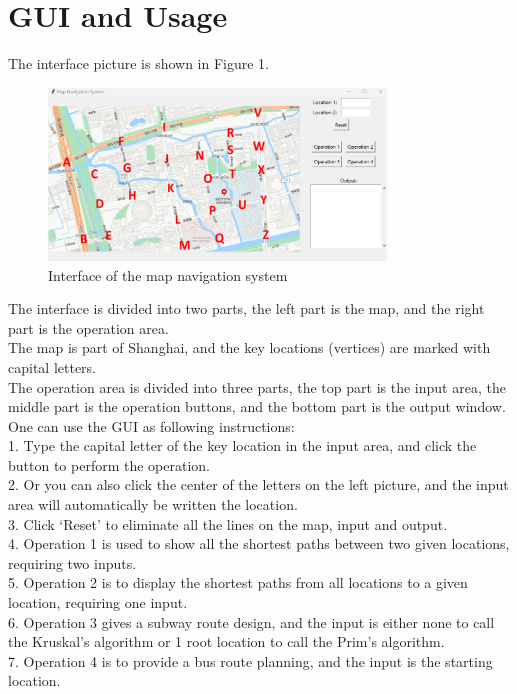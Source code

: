 \documentclass[UTF8]{ctexart}
\begin{document}
\section{GUI and Usage}
The interface picture is shown in Figure 1.\\
\begin{figure}[H]
    \centering
    \includegraphics[width=0.8\textwidth]{gui.png}
    \caption{Interface of the map navigation system}
\end{figure}
The interface is divided into two parts, the left part is the map, and the right part is the operation area.\\
The map is part of Shanghai, and the key locations (vertices) are marked with capital letters.\\
The operation area is divided into three parts, the top part is the input area, the middle part is the operation buttons,
and the bottom part is the output window.\\
One can use the GUI as following instructions:\\
1. Type the capital letter of the key location in the input area, and click the button to perform the operation.\\
2. Or you can also click the center of the letters on the left picture, and the input area will automatically be written the location.\\
3. Click `Reset' to eliminate all the lines on the map, input and output.\\
4. Operation 1 is used to show all the shortest paths between two given locations, requiring two inputs.\\
5. Operation 2 is to display the shortest paths from all locations to a given location, requiring one input.\\
6. Operation 3 gives a subway route design, and the input is either none to call the Kruskal's algorithm or 1 root location to call the Prim's algorithm.\\
7. Operation 4 is to provide a bus route planning, and the input is the starting location.\\
\end{document}
